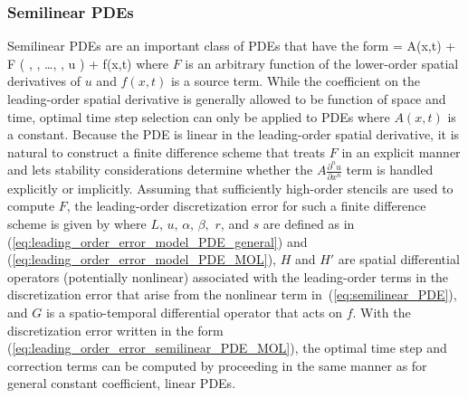 \documentclass[oneeqnum,onefignum,onetabnum,onethmnum]{siamltex}
\begin{document}
\subsubsection*{Semilinear PDEs}
Semilinear PDEs are an important class of PDEs that have the form
\beq
   = A(x,t) 
  + F \left( ,
      , \ldots,
      , u \right)
  + f(x,t)
  \label{eq:semilinear_PDE}
\eeq
where $F$ is an arbitrary function of the lower-order spatial derivatives
of $u$ and $f(x,t)$ is a source term.  While the coefficient on the 
leading-order spatial derivative is generally allowed to be function of 
space and time, optimal time step selection can only be applied to PDEs where
$A(x,t)$ is a constant.  Because the PDE is linear in the leading-order 
spatial derivative, it is natural to construct a finite difference scheme that 
treats $F$ in an explicit manner and lets stability considerations determine 
whether the $A \frac{\partial^n u}{\partial x^n}$ term is handled explicitly 
or implicitly.  Assuming that sufficiently high-order stencils are used to 
compute $F$, the leading-order discretization error for such a finite 
difference scheme is given by
\bea
  \dt {}
  \label{eq:leading_order_error_semilinear_PDE_MOL}
\eea
where $L$, $u$, $\alpha$, $\beta,$ $r$, and $s$ are defined as in
(\ref{eq:leading_order_error_model_PDE_general}) and
(\ref{eq:leading_order_error_model_PDE_MOL}), $H$ and $H'$ are spatial 
differential operators (potentially nonlinear) associated with the 
leading-order terms in the discretization error that arise from the nonlinear 
term in~(\ref{eq:semilinear_PDE}), and $G$ is a spatio-temporal differential 
operator that acts on $f$.  With the discretization error written in the 
form (\ref{eq:leading_order_error_semilinear_PDE_MOL}), the optimal time 
step and correction terms can be computed by proceeding in the same manner 
as for general constant coefficient, linear PDEs.
\end{document}
